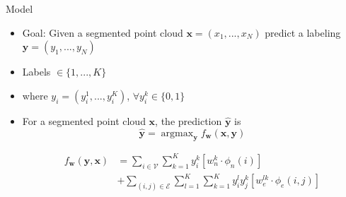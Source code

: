 \documentclass{beamer}
\DeclareMathOperator*{\argmax}{argmax}
\newcommand{\x}{{\mathbf x}}     %
\newcommand{\xs}[1]{{x_{#1}}}    %
\newcommand{\y}{{\mathbf y}}     %
\newcommand{\ys}[1]{{y_{#1}}}    %
\newcommand{\ysc}[2]{{y_{#1}^{#2}}}    %
\newcommand{\fn}[1]{{\phi_n(#1)}}      %
\newcommand{\fe}[3]{{\phi_{#1}(#2,#3)}}%
\newcommand{\w}{{\mathbf w}}           %
\newcommand{\wn}[1]{{w_n^{#1}}}        %
\newcommand{\we}[3]{{w_{#1}^{#2#3}}}   %
\newcommand{\df}[3]{{f_{#3}(#1,#2)}}   %
\begin{document}
\begin{frame}{Model}
\begin{itemize}


\item Goal: Given a segmented point cloud $\x=(\xs{1},...,\xs{N})$  predict a labeling $\y=(\ys{1},...,\ys{N})$
\item Labels $\in  \{ 1, ..., K \} $
\item where $\ys{i}=(\ysc{i}{1},...,\ysc{i}{K})$,  $ \forall \ysc{i}{k} \in \{0,1\}$ 


\item For a segmented point cloud $\x$, the prediction $\hat{\y}$ is 
\begin{equation} \label{eq:argmax}
\hat{\y} = \argmax_\y \df{\x}{\y}{\w}
\end{equation}

\pause
\begin{equation} \label{eq:model}
\begin{split}
\df{\y}{\x}{\w} & = \sum_{i \in \mathcal{V}} \sum_{k=1}^{K} \ysc{i}{k} \left[\wn{k} \cdot \fn{i} \right] \\
 & + \sum_{(i,j)\in \mathcal{E}}   \sum_{l=1}^{K}  \sum_{k=1}^{K} \ysc{i}{l} \ysc{j}{k}  \left[\we{e}{l}{k} \cdot \fe{e}{i}{j}\right] 
 \end{split}
\end{equation}

\end{itemize}
\end{frame}

\end{document}
